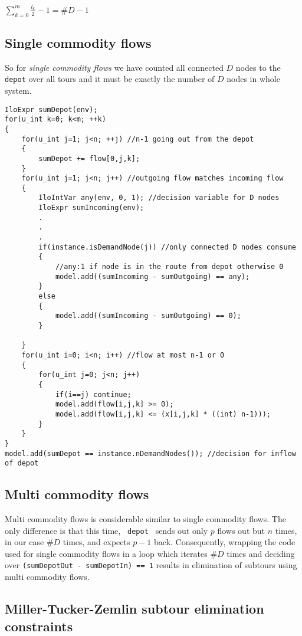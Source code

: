 \begin{center}
$\sum_{k=0}^{m}{\frac{l_k}{2}-1} = \#D - 1$
\end{center}

\subsection{Single commodity flows}

So for {\it single commodity flows} we have counted all connected $D$ nodes to
the \texttt{depot} over all tours and it must be exactly the number of $D$ nodes in whole system.

\begin{lstlisting}
IloExpr sumDepot(env);
for(u_int k=0; k<m; ++k)
{
    for(u_int j=1; j<n; ++j) //n-1 going out from the depot
    {
        sumDepot += flow[0,j,k];
    }
    for(u_int j=1; j<n; j++) //outgoing flow matches incoming flow
    {
        IloIntVar any(env, 0, 1); //decision variable for D nodes
        IloExpr sumIncoming(env);
        .
        .
        .
        if(instance.isDemandNode(j)) //only connected D nodes consume
        {
            //any:1 if node is in the route from depot otherwise 0
            model.add((sumIncoming - sumOutgoing) == any);
        }
        else
        {
            model.add((sumIncoming - sumOutgoing) == 0);
        }

    }
    for(u_int i=0; i<n; i++) //flow at most n-1 or 0
    {
        for(u_int j=0; j<n; j++)
        {
            if(i==j) continue;
            model.add(flow[i,j,k] >= 0);
            model.add(flow[i,j,k] <= (x[i,j,k] * ((int) n-1)));
        }
    }
}
model.add(sumDepot == instance.nDemandNodes()); //decision for inflow of depot
\end{lstlisting}

\subsection{Multi commodity flows}


Multi commodity flows is considerable similar to single commodity flows. The
only difference is that this time, \texttt{ depot } sends out only $p$ flows out
but $n$ times, in our case $\#D$ times, and expects $p-1$ back. Consequently,
wrapping the code used for single commodity flows in a loop which iterates $\#D$
times and deciding over \texttt{(sumDepotOut - sumDepotIn) == 1} results in
elimination of subtours using multi commodity flows.

\subsection{Miller-Tucker-Zemlin subtour elimination constraints}

